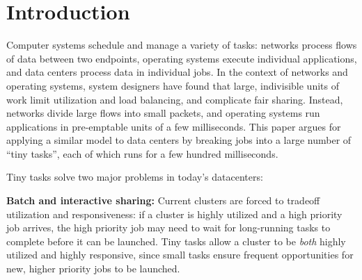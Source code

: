 \section{Introduction}
Computer systems schedule and manage a variety of tasks:
networks process flows of data
between two endpoints, operating systems execute individual applications, and
data centers process data in individual jobs.  In the context of networks and
operating systems, system designers have found that large, indivisible units of work limit utilization and load balancing,
and complicate fair sharing.  Instead, networks divide large flows into small
packets, and operating systems run applications in pre-emptable units of a
few milliseconds.  This paper argues for
applying a similar model to data centers by breaking jobs into
a large number of ``tiny tasks'', each of which runs for a few hundred
milliseconds.

Tiny tasks solve two major problems in today's datacenters:

\vspace{4pt}\noindent\textbf{Batch and interactive sharing:}
Current clusters are forced to tradeoff utilization and responsiveness:
if a cluster is highly utilized and a high priority job arrives, the
high priority job may
need to wait for long-running tasks to complete before it can be launched.
Tiny tasks allow a cluster to be \emph{both} highly utilized and highly
responsive, since small tasks ensure frequent opportunities for new,
higher priority jobs to be launched.

